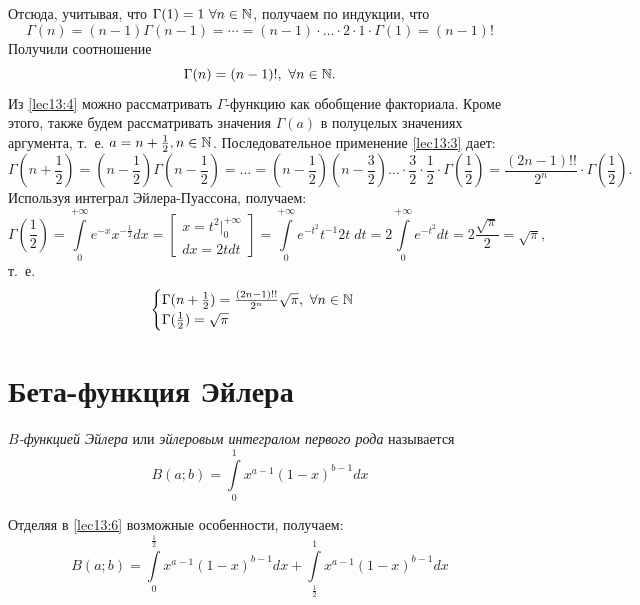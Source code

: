 \documentclass[../../main.tex]{subfiles}
\begin{document}
Отсюда, учитывая, что $\Gamma(1) = 1\ \forall n \in \N$, получаем по индукции, что
\[\Gamma(n) = (n-1)\Gamma(n-1) = \cdots = (n-1) \cdot \ldots \cdot 2 \cdot 1 \cdot 
\Gamma(1) = (n-1)!\]
Получили соотношение
\begin{equation}
\label{lec13:4}
\Gamma(n) = (n-1)!,\ \forall n \in \mathbb{N}.
\end{equation}
Из \eqref{lec13:4} можно рассматривать $\Gamma$-функцию как обобщение факториала. Кроме этого, также будем рассматривать значения $\Gamma(a)$ в полуцелых значениях аргумента, т.~е. $a = {n + \frac{1}{2}}, {n \in \mathbb{N}}$.
Последовательное применение \eqref{lec13:3} дает:
\[
\Gamma\left(n + \frac{1}{2}\right) = \left(n - \frac{1}{2}\right)\Gamma\left(n-\frac{1}{2}\right)=\ldots=
\left(n-\frac{1}{2}\right)\left(n-\frac{3}{2}\right)\ldots\cdot \frac{3}{2} \cdot \frac{1}{2} \cdot \Gamma\left(\frac{1}{2}\right) 
= 
\frac{(2n-1)!!}{2^n}\cdot \Gamma\left(\frac{1}{2}\right).
\]
Используя интеграл Эйлера-Пуассона, получаем:
\[
\Gamma\left(\frac{1}{2}\right) = \int\limits_0^{+\infty} e^{-x} x^{-\frac{1}{2}} dx = \left[\begin{array}{l}
x = t^2|_0^{+\infty} \\ dx = 2tdt
\end{array}
\right] = 
\int\limits_0^{+\infty} e^{-t^2} t^{-1} 2t\; dt = 2 \int\limits_0^{+\infty} 
e^{-t^2} dt 
= 2 \frac{\sqrt{\pi}}{2} = \sqrt{\pi},
\]
т.~е.
\begin{equation}
	\label{lec13:5}
	\begin{cases}
		\Gamma(n+\frac{1}{2}) = \frac{(2n-1)!!}{2^n} \sqrt{\pi},\ \forall n \in \N \\
		\Gamma(\frac{1}{2}) = \sqrt{\pi}
	\end{cases}
\end{equation}

\section{Бета-функция Эйлера}
\emph{$B$-функцией Эйлера} или \emph{эйлеровым интегралом первого рода} называется
\begin{equation}
	\label{lec13:6}
	B(a; b) = \int\limits_0^1x^{a-1}(1-x)^{b-1}dx
\end{equation}

Отделяя в \eqref{lec13:6} возможные особенности, получаем:
\begin{equation}
	\label{lec13:7}
	B(a; b) = \int\limits_0^{\frac{1}{2}} 
	x^{a-1} (1-x)^{b-1}dx + \int\limits_{\frac{1}{2}}^{1} 
	x^{a-1}(1-x)^{b-1}dx
\end{equation}
\end{document}
